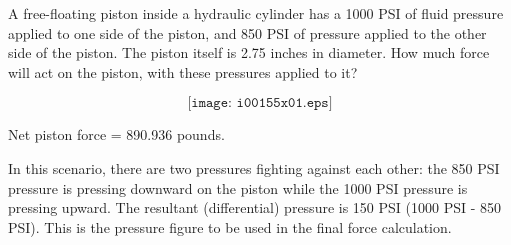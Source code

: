 

A free-floating piston inside a hydraulic cylinder has a 1000 PSI of fluid pressure applied to one side of the piston, and 850 PSI of pressure applied to the other side of the piston.  The piston itself is 2.75 inches in diameter.  How much force will act on the piston, with these pressures applied to it?

$$\texttt{[image: i00155x01.eps]}$$







Net piston force = 890.936 pounds.

\vskip 10pt

In this scenario, there are two pressures fighting against each other: the 850 PSI pressure is pressing downward on the piston while the 1000 PSI pressure is pressing upward.  The resultant (differential) pressure is 150 PSI (1000 PSI - 850 PSI).  This is the pressure figure to be used in the final force calculation.










